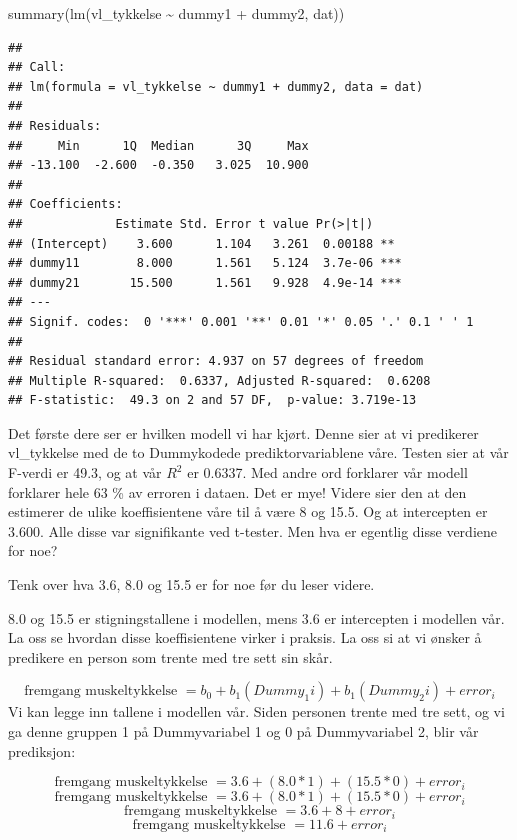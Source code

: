 \documentclass[
]{book}
\newenvironment{Shaded}{\begin{snugshade}}{\end{snugshade}}
\newcommand{\FunctionTok}[1]{\textcolor[rgb]{0.00,0.00,0.00}{#1}}
\newcommand{\NormalTok}[1]{#1}
\newcommand{\SpecialCharTok}[1]{\textcolor[rgb]{0.00,0.00,0.00}{#1}}
\begin{document}
\begin{Shaded}
\begin{Highlighting}[]
\FunctionTok{summary}\NormalTok{(}\FunctionTok{lm}\NormalTok{(vl\_tykkelse }\SpecialCharTok{\textasciitilde{}}\NormalTok{ dummy1 }\SpecialCharTok{+}\NormalTok{ dummy2, dat))}
\end{Highlighting}
\end{Shaded}

\begin{verbatim}
## 
## Call:
## lm(formula = vl_tykkelse ~ dummy1 + dummy2, data = dat)
## 
## Residuals:
##     Min      1Q  Median      3Q     Max 
## -13.100  -2.600  -0.350   3.025  10.900 
## 
## Coefficients:
##             Estimate Std. Error t value Pr(>|t|)    
## (Intercept)    3.600      1.104   3.261  0.00188 ** 
## dummy11        8.000      1.561   5.124  3.7e-06 ***
## dummy21       15.500      1.561   9.928  4.9e-14 ***
## ---
## Signif. codes:  0 '***' 0.001 '**' 0.01 '*' 0.05 '.' 0.1 ' ' 1
## 
## Residual standard error: 4.937 on 57 degrees of freedom
## Multiple R-squared:  0.6337, Adjusted R-squared:  0.6208 
## F-statistic:  49.3 on 2 and 57 DF,  p-value: 3.719e-13
\end{verbatim}

Det første dere ser er hvilken modell vi har kjørt. Denne sier at vi predikerer vl\_tykkelse med de to Dummykodede prediktorvariablene våre. Testen sier at vår F-verdi er 49.3, og at vår \(R^2\) er 0.6337. Med andre ord forklarer vår modell forklarer hele 63 \% av erroren i dataen. Det er mye! Videre sier den at den estimerer de ulike koeffisientene våre til å være 8 og 15.5. Og at intercepten er 3.600. Alle disse var signifikante ved t-tester. Men hva er egentlig disse verdiene for noe?

Tenk over hva 3.6, 8.0 og 15.5 er for noe før du leser videre.

8.0 og 15.5 er stigningstallene i modellen, mens 3.6 er intercepten i modellen vår. La oss se hvordan disse koeffisientene virker i praksis. La oss si at vi ønsker å predikere en person som trente med tre sett sin skår.

\[
\text{fremgang muskeltykkelse } = b_0 + b_1(Dummy_1i) + b_1(Dummy_2i) + error_i
\]
Vi kan legge inn tallene i modellen vår. Siden personen trente med tre sett, og vi ga denne gruppen 1 på Dummyvariabel 1 og 0 på Dummyvariabel 2, blir vår prediksjon:

\[
\text{fremgang muskeltykkelse } = 3.6 + (8.0 * 1) + (15.5 * 0)  + error_i
\]
\[
\text{fremgang muskeltykkelse } = 3.6 + (8.0 * 1) + (15.5 * 0)  + error_i
\]
\[
\text{fremgang muskeltykkelse } = 3.6 + 8  + error_i
\]
\[
\text{fremgang muskeltykkelse } = 11.6  + error_i
\]
\end{document}
